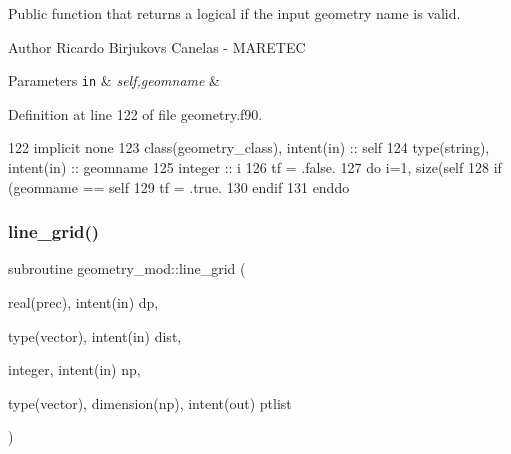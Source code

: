 Public function that returns a logical if the input geometry name is valid. 

\begin{DoxyAuthor}{Author}
Ricardo Birjukovs Canelas -\/ M\+A\+R\+E\+T\+EC 
\end{DoxyAuthor}

\begin{DoxyParams}[1]{Parameters}
\mbox{\tt in}  & {\em self,geomname} & \\
\hline
\end{DoxyParams}


Definition at line 122 of file geometry.\+f90.


\begin{DoxyCode}
122     \textcolor{keywordtype}{implicit none}
123     \textcolor{keywordtype}{class}(geometry\_class), \textcolor{keywordtype}{intent(in)} :: self
124     \textcolor{keywordtype}{type}(string), \textcolor{keywordtype}{intent(in)} :: geomname
125     \textcolor{keywordtype}{integer} :: i
126     tf = .false.
127     \textcolor{keywordflow}{do} i=1, \textcolor{keyword}{size}(self%
128         \textcolor{keywordflow}{if} (geomname == self%
129             tf = .true.
130 \textcolor{keywordflow}{        endif}
131 \textcolor{keywordflow}{    enddo}
\end{DoxyCode}
\mbox{\label{namespacegeometry__mod_abcb09c0f5274c27cb79b0dd009ed94b3}} 
\subsubsection{\texorpdfstring{line\+\_\+grid()}{line\_grid()}}
{\footnotesize\ttfamily subroutine geometry\+\_\+mod\+::line\+\_\+grid (\begin{DoxyParamCaption}\item[{real(prec), intent(in)}]{dp,  }\item[{type(vector), intent(in)}]{dist,  }\item[{integer, intent(in)}]{np,  }\item[{type(vector), dimension(np), intent(out)}]{ptlist }\end{DoxyParamCaption})\hspace{0.3cm}{\ttfamily [private]}}



